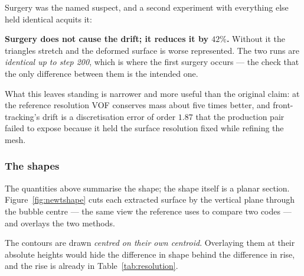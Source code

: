 Surgery was the named suspect, and a second experiment with everything else
held identical acquits it:


\textbf{Surgery does not cause the drift; it reduces it by $42\%$.} Without it
the triangles stretch and the deformed surface is worse represented. The two
runs are \emph{identical up to step 200}, which is where the first surgery
occurs --- the check that the only difference between them is the intended one.

What this leaves standing is narrower and more useful than the original claim:
at the reference resolution VOF conserves mass about five times better, and
front-tracking's drift is a discretisation error of order $1.87$ that the
production pair failed to expose because it held the surface resolution fixed
while refining the mesh.

\subsubsection{The shapes}

The quantities above summarise the shape; the shape itself is a planar section.
Figure~\ref{fig:newtshape} cuts each extracted surface by the vertical plane
through the bubble centre --- the same view the reference uses to compare two
codes --- and overlays the two methods.

The contours are drawn \emph{centred on their own centroid}. Overlaying them at
their absolute heights would hide the difference in shape behind the difference
in rise, and the rise is already in Table~\ref{tab:resolution}.

